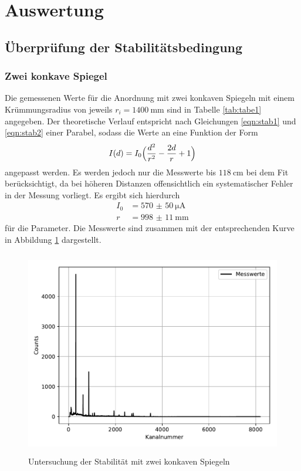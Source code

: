 \section{Auswertung}
\label{sec:Auswertung}



\subsection{Überprüfung der Stabilitätsbedingung}

\subsubsection{Zwei konkave Spiegel}
Die gemessenen Werte für die Anordnung mit zwei konkaven Spiegeln mit einem
Krümmungsradius von jeweils $r_i = \SI{1400}{\milli\meter}$ sind in Tabelle \ref{tab:tabe1}
angegeben. Der theoretische Verlauf entspricht nach Gleichungen \ref{eqn:stab1}
und \ref{eqn:stab2} einer Parabel,
sodass die Werte an eine Funktion der Form
\begin{equation}
  I(d)= I_0\Bigl(\frac{d^2}{r^2}-\frac{2d}{r}+1\Bigr)
\end{equation}
angepasst werden. Es werden jedoch nur die Messwerte bis $\SI{118}{\centi\meter}$
bei dem Fit berücksichtigt, da bei höheren Distanzen offensichtlich ein systematischer
Fehler in der Messung vorliegt.
Es ergibt sich hierdurch
\begin{align*}
  I_0 &= \SI{570(50)}{\micro\ampere} \\
  r &=\SI{998(11)}{\milli\meter}
\end{align*}
für die Parameter. Die Messwerte sind zusammen mit der
entsprechenden Kurve in Abbildung \ref{fig:plot1} dargestellt.
\begin{figure}
  \centering
  \includegraphics[height=9cm]{Plot1.pdf}
  \caption{Untersuchung der Stabilität mit zwei konkaven Spiegeln}
  \label{fig:plot1}
\end{figure}

